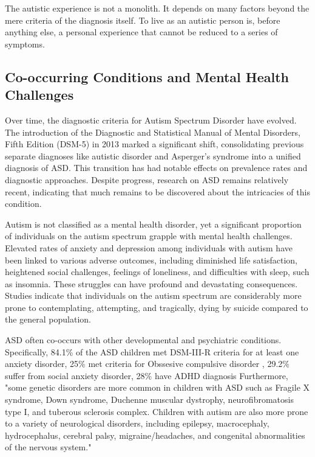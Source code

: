 The autistic experience is not a monolith. It depends on many factors beyond the mere criteria of the diagnosis itself. To live as an autistic person is, before anything else, a personal experience that cannot be reduced to a series of symptoms. 

\subsection{Co-occurring Conditions and Mental Health Challenges}

Over time, the diagnostic criteria for Autism Spectrum Disorder have evolved. The introduction of the Diagnostic and Statistical Manual of Mental Disorders, Fifth Edition (DSM-5) in 2013 marked a significant shift, consolidating previous separate diagnoses like autistic disorder and Asperger's syndrome into a unified diagnosis of ASD. This transition has had notable effects on prevalence rates and diagnostic approaches. Despite progress, research on ASD remains relatively recent, indicating that much remains to be discovered about the intricacies of this condition.

Autism is not classified as a mental health disorder, yet a significant proportion of individuals on the autism spectrum grapple with mental health challenges. Elevated rates of anxiety and depression among individuals with autism have been linked to various adverse outcomes, including diminished life satisfaction, heightened social challenges, feelings of loneliness, and difficulties with sleep, such as insomnia. These struggles can have profound and devastating consequences. Studies indicate that individuals on the autism spectrum are considerably more prone to contemplating, attempting, and tragically, dying by suicide compared to the general population.

ASD often co-occurs with other developmental and psychiatric conditions.
Specifically, 84.1\% of the ASD children met DSM-III-R criteria for at least one anxiety disorder, 25\% met criteria for Obssesive compulsive disorder \cite{2009AnxietyChildrenAdolescents}, 29.2\% suffer from social anxiety disorder, 28\% have ADHD diagnosis \cite{2008PsychiatricDisordersChildren} Furthermore, "some genetic disorders are more common in children with ASD such as Fragile X syndrome, Down syndrome, Duchenne muscular dystrophy, neurofibromatosis type I, and tuberous sclerosis complex. Children with autism are also more prone to a variety of neurological disorders, including epilepsy, macrocephaly, hydrocephalus, cerebral palsy, migraine/headaches, and congenital abnormalities of the nervous system." \cite{2021AutismMedicalComorbidities}

